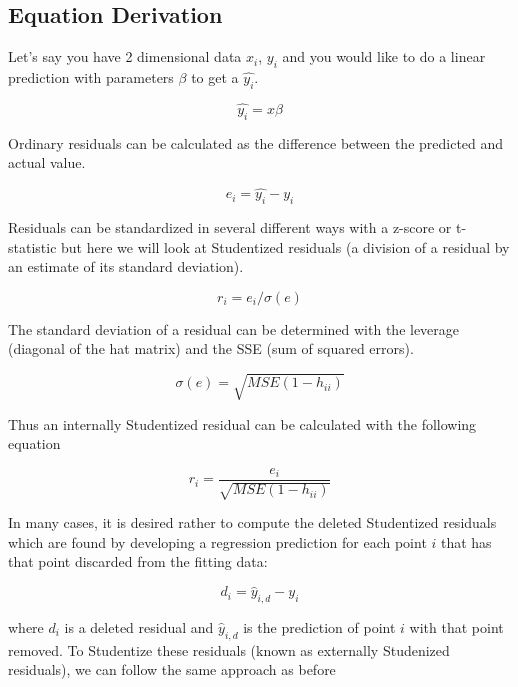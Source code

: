 \documentclass{article}
\begin{document}
	
	
\subsection{Equation Derivation}

Let's say you have 2 dimensional data $x_i$, $y_i$ and you would like to do a linear prediction with parameters $\beta$ to get a $\hat{y_i}$. 

\begin{equation}
	\hat{y_i} = x\beta 
\end{equation}

Ordinary residuals can be calculated as the difference between the predicted and actual value. 

\begin{equation}
e_i = \hat{y_i} - y_i
\end{equation}

Residuals can be standardized in several different ways with a z-score or t-statistic but here we will look at Studentized residuals (a division of a residual by an estimate of its standard deviation). 

\begin{equation}
r_i = e_i/\sigma(e)
\end{equation}

The standard deviation of a residual can be determined with the leverage (diagonal of the hat matrix) and the SSE (sum of squared errors). 

\begin{equation}
	\sigma(e)=\sqrt{MSE(1-h_{ii})}
\end{equation}

Thus an internally Studentized residual can be calculated with the following equation

\begin{equation}
r_i = \frac{e_i}{\sqrt{MSE(1-h_{ii})}}
\end{equation}

In many cases, it is desired rather to compute the deleted Studentized residuals which are found by developing a regression prediction for each point $i$ that has that point discarded from the fitting data: 

\begin{equation}
d_i = \hat{y}_{i, d}- y_i
\end{equation}

where $d_i$ is a deleted residual and $\hat{y}_{i, d}$ is the prediction of point $i$ with that point removed. To Studentize these residuals (known as externally Studenized residuals), we can follow the same approach as before
\end{document}
